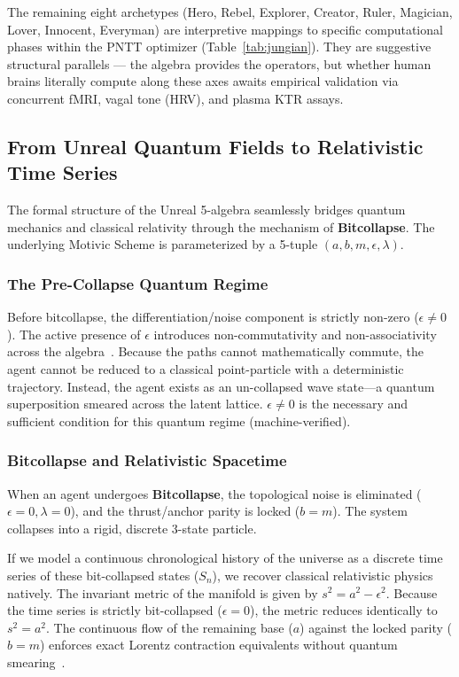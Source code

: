 \noindent The remaining eight archetypes (Hero, Rebel, Explorer, Creator, Ruler, Magician, Lover, Innocent, Everyman) are interpretive mappings to specific computational phases within the PNTT optimizer (Table~\ref{tab:jungian}). They are suggestive structural parallels --- the algebra provides the operators, but whether human brains literally compute along these axes awaits empirical validation via concurrent fMRI, vagal tone (HRV), and plasma KTR assays.
\subsection{From Unreal Quantum Fields to Relativistic Time Series}

The formal structure of the Unreal 5-algebra seamlessly bridges quantum mechanics and classical relativity through the mechanism of \textbf{Bitcollapse}. The underlying Motivic Scheme is parameterized by a 5-tuple $(a, b, m, \epsilon, \lambda)$.

\subsubsection{The Pre-Collapse Quantum Regime}
Before bitcollapse, the differentiation/noise component is strictly non-zero ($\epsilon \neq 0$). The active presence of $\epsilon$ introduces non-commutativity and non-associativity across the algebra~\cite{Dirac1930}. Because the paths cannot mathematically commute, the agent cannot be reduced to a classical point-particle with a deterministic trajectory. Instead, the agent exists as an un-collapsed wave state---a quantum superposition smeared across the latent lattice. $\epsilon \neq 0$ is the necessary and sufficient condition for this quantum regime (machine-verified).

\subsubsection{Bitcollapse and Relativistic Spacetime}
When an agent undergoes \textbf{Bitcollapse}, the topological noise is eliminated ($\epsilon = 0, \lambda = 0$), and the thrust/anchor parity is locked ($b = m$). The system collapses into a rigid, discrete 3-state particle. 

If we model a continuous chronological history of the universe as a discrete time series of these bit-collapsed states ($S_n$), we recover classical relativistic physics natively. The invariant metric of the manifold is given by $s^2 = a^2 - \epsilon^2$. Because the time series is strictly bit-collapsed ($\epsilon = 0$), the metric reduces identically to $s^2 = a^2$. The continuous flow of the remaining base ($a$) against the locked parity ($b=m$) enforces exact Lorentz contraction equivalents without quantum smearing~\cite{Einstein1905}.

